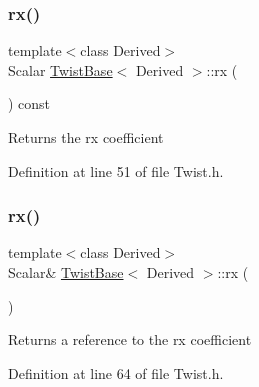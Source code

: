 \hypertarget{class_twist_base_a894919d086a24def57622d7e151a58c2}{}\label{class_twist_base_a894919d086a24def57622d7e151a58c2} 
\subsubsection{\texorpdfstring{rx()}{rx()}\hspace{0.1cm}{\footnotesize\ttfamily [1/2]}}
{\footnotesize\ttfamily template$<$class Derived$>$ \\
Scalar \hyperlink{class_twist_base}{Twist\+Base}$<$ Derived $>$\+::rx (\begin{DoxyParamCaption}{ }\end{DoxyParamCaption}) const\hspace{0.3cm}{\ttfamily [inline]}}

\begin{DoxyReturn}{Returns}
the {\ttfamily rx} coefficient 
\end{DoxyReturn}


Definition at line 51 of file Twist.\+h.

\hypertarget{class_twist_base_a9622270eb8e0f450bce5b356ee10f205}{}\label{class_twist_base_a9622270eb8e0f450bce5b356ee10f205} 
\subsubsection{\texorpdfstring{rx()}{rx()}\hspace{0.1cm}{\footnotesize\ttfamily [2/2]}}
{\footnotesize\ttfamily template$<$class Derived$>$ \\
Scalar\& \hyperlink{class_twist_base}{Twist\+Base}$<$ Derived $>$\+::rx (\begin{DoxyParamCaption}{ }\end{DoxyParamCaption})\hspace{0.3cm}{\ttfamily [inline]}}

\begin{DoxyReturn}{Returns}
a reference to the {\ttfamily rx} coefficient 
\end{DoxyReturn}


Definition at line 64 of file Twist.\+h.

\hypertarget{class_twist_base_a649f10b163fa68cd901aa3ee412ced7f}{}\label{class_twist_base_a649f10b163fa68cd901aa3ee412ced7f} 
